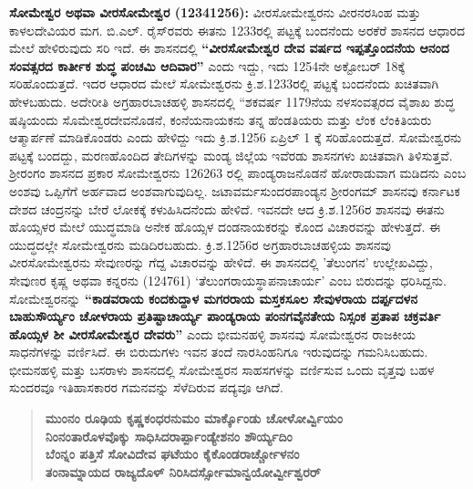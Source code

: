\textbf{ಸೋಮೇಶ್ವರ ಅಥವಾ ವೀರಸೋಮೇಶ್ವರ (1234\general{\enginline{-}}1256):} ವೀರಸೋಮೇಶ್ವರನು ವೀರನರಸಿಂಹ ಮತ್ತು ಕಾಳಲದೇವಿಯರ ಮಗ. ಬಿ.ಎಲ್​. ರೈಸ್​ರವರು ಈತನು 1233ರಲ್ಲಿ ಪಟ್ಟಕ್ಕೆ ಬಂದನೆಂದು ಅರಕೆರೆ ಶಾಸನದ ಆಧಾರದ ಮೇಲೆ ಹೇಳಿರುವುದು ಸರಿ ಇದೆ. ಈ ಶಾಸನದಲ್ಲಿ \textbf{“ವೀರಸೋಮೇಶ್ವರ ದೇವ ವರ್ಷದ ಇಪ್ಪತ್ತೊಂದನೆಯ ಆನಂದ ಸಂವತ್ಸರದ ಕಾರ್ತೀಕ ಶುದ್ಧ ಪಂಚಮಿ ಆದಿವಾರ”} ಎಂದು ಇದ್ದು, ಇದು 1254ನೇ ಅಕ್ಟೋಬರ್​ 18ಕ್ಕೆ ಸರಿಹೊಂದುತ್ತದೆ. ಇದರ ಆಧಾರದ ಮೇಲೆ ಸೋಮೇಶ್ವರನು ಕ್ರಿ.ಶ.1233ರಲ್ಲಿ ಪಟ್ಟಕ್ಕೆ ಬಂದನೆಂದು ಖಚಿತವಾಗಿ ಹೇಳಬಹುದು. ಅದೇರೀತಿ ಅಗ್ರಹಾರಬಾಚಹಳ್ಳಿ ಶಾಸನದಲ್ಲಿ “ಶಕವರ್ಷ 1179ನೆಯ ನಳಸಂವತ್ಸರದ ವೈಶಾಖ ಶುದ್ಧ ಷಷ್ಠಿಯಂದು ಸೊಮೇಶ್ವರದೇವನೊಡನೆ, ಕಂನೆಯ\-ನಾಯಕನು ತನ್ನ ಹೆಂಡತಿಯರು ಮತ್ತು ಲೆಂಕ ಲೆಂಕಿತಿಯರು ಆತ್ಮಾರ್ಪಣೆ ಮಾಡಿಕೊಂಡರು ಎಂದು ಹೇಳಿದ್ದು ಇದು ಕ್ರಿ.ಶ.1256 ಏಪ್ರಿಲ್​ 1 ಕ್ಕೆ ಸರಿಹೊಂದುತ್ತದೆ. ಸೋಮೇಶ್ವರನು ಪಟ್ಟಕ್ಕೆ ಬಂದದ್ದು, ಮರಣಹೊಂದಿದ ತೇದಿಗಳನ್ನು ಮಂಡ್ಯ ಜಿಲ್ಲೆಯ ಇವೆರಡು ಶಾಸನಗಳು ಖಚಿತವಾಗಿ ತಿಳಿಸುತ್ತವೆ. ಶ‍್ರೀರಂಗಂ ಶಾಸನದ ಪ್ರಕಾರ ಸೋಮೇಶ್ವರನು 1262\enginline{-}63 ರಲ್ಲಿ ಪಾಂಡ್ಯರಾಜನೊಡನೆ ಹೋರಾಡುವಾಗ ಮಡಿದನು ಎಂಬ ಅಂಶವು ಒಪ್ಪಿಗೆಗೆ ಅರ್ಹವಾದ ಅಂಶವಾಗುವುದಿಲ್ಲ. ಜಟಾವರ್ಮಸುಂದರಪಾಂಡ್ಯನ ಶ‍್ರೀರಂಗಮ್ ಶಾಸನವು ಕರ್ನಾಟಕ ದೇಶದ ಚಂದ್ರನನ್ನು ಬೇರೆ ಲೋಕಕ್ಕೆ ಕಳುಹಿಸಿದನೆಂದು ಹೇಳಿದೆ. ಇವನದೇ ಆದ ಕ್ರಿ.ಶ.1256ರ ಶಾಸನವು ಈತನು ಹೊಯ್ಸಳರ ಮೇಲೆ ಯುದ್ಧಮಾಡಿ ಅನೇಕ ಹೊಯ್ಸಳ ದಂಡನಾಯಕರನ್ನು ಕೊಂದ ವಿಚಾರವನ್ನು ಹೇಳುತ್ತದೆ. ಈ ಯುದ್ಧದಲ್ಲೇ ಸೋಮೇಶ್ವರನು ಮಡಿದಿರಬಹುದು. ಕ್ರಿ.ಶ.1256ರ ಅಗ್ರಹಾರಬಾಚಹಳ್ಳಿಯ ಶಾಸನವು ವೀರಸೋಮೇಶ್ವರನು ಸೇವುಣರನ್ನು ಗೆದ್ದ ವಿಚಾರವನ್ನು ಹೇಳಿದೆ. ಈ ಶಾಸನದಲ್ಲಿ 'ತೆಲುಂಗನ' ಉಲ್ಲೇಖವಿದ್ದು, ಸೇವುಣರ ಕೃಷ್ಣ ಅಥವಾ ಕನ್ನರನು (1247\enginline{-}61) `ತೆಲುಂಗರಾಯಸ್ಥಾಪನಾಚಾರ್ಯ' ಎಂಬ ಬಿರುದನ್ನು ಧರಿಸಿದ್ದನು. ಸೋಮೇಶ್ವರನನ್ನು \textbf{“ಕಾಡವರಾಯ ಕಂದಕುದ್ದಾಳ ಮಗರರಾಯ ಮಸ್ತಕಸೂಲ ಸೇವುಳರಾಯ ದರ್ಪ್ಪದಳನ ಬಾಹುಸೌರ್ಯ್ಯಂ ಚೋಳರಾಯ ಪ್ರತಿಷ್ಟಾಚಾರ್ಯ್ಯ ಪಾಂಡ್ಯರಾಯ ಪಂನಗವೈನತೇಯ ನಿಸ್ಸಂಕ ಪ್ರತಾಪ ಚಕ್ರವರ್ತಿ ಹೊಯ್ಸಳ ಶೀ ವೀರಸೋಮೇಶ್ವರ ದೇವರು”} ಎಂದು ಭೀಮನಹಳ್ಳಿ ಶಾಸನವು ಸೋಮೇಶ್ವರನ ರಾಜಕೀಯ ಸಾಧನೆಗಳನ್ನು ವರ್ಣಿಸಿದೆ. ಈ ಬಿರುದುಗಳು ಇವನ ತಂದೆ ನಾರಸಿಂಹನಿಗೂ ಇರುವುದನ್ನು ಗಮನಿಸಿಬಹುದು. ಭೀಮನಹಳ್ಳಿ ಮತ್ತು ಬಸರಾಳು ಶಾಸನದಲ್ಲಿ ಸೋಮೇಶ್ವರನ ಸಾಹಸಗಳನ್ನು ವರ್ಣಿಸುವ ಒಂದು ವೃತ್ತವು ಬಹಳ ಸುಂದರವೂ ಇತಿಹಾಸಕಾರರ ಗಮನವನ್ನು ಸೆಳೆದಿರುವ ಪದ್ಯವೂ ಆಗಿದೆ.

\begin{verse}
\textbf{ಮುಂನಂ ರೂಢಿಯ ಕೃಷ್ಣಕಂಧರನುಮಂ ಮಾರ್ಕ್ಕೊಂಡು ಚೋಳೋರ್ವ್ವಿಯಂ} \\\textbf{ನಿಂನಂತಾರೊಳವೊಕ್ಕು ಸಾಧಿಸಿದರಾರ್ಪ್ಪಾಂಡ್ಯೇಶನಂ ಶೌರ್ಯ್ಯದಿಂ} \\\textbf{ಬೆಂನ್ನಂ ಪತ್ತಿಸೆ ಸೋವಿದೇವ ಘಟೆಯಂ ಕೈಕೊಂಡರಾರ್ಚ್ಚೋಳನಂ} \\\textbf{ತಂನಾಮ್ನಾಯದ ರಾಜ್ಯದೊಳ್​ ನಿರಿಸಿದರ್ಸ್ಸೋಮಾನ್ವಯೋರ್ವ್ವೀಶ್ವರರ್​}
\end{verse}

